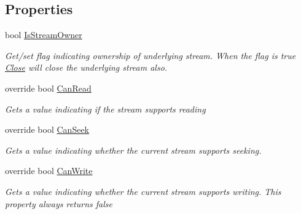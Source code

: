 \subsection*{Properties}
\begin{DoxyCompactItemize}
\item 
bool \hyperlink{class_i_c_sharp_code_1_1_sharp_zip_lib_1_1_b_zip2_1_1_b_zip2_input_stream_ac3a519335b1b9d046e6b7e124ff407f7}{Is\+Stream\+Owner}
\begin{DoxyCompactList}\small\item\em Get/set flag indicating ownership of underlying stream. When the flag is true \hyperlink{class_i_c_sharp_code_1_1_sharp_zip_lib_1_1_b_zip2_1_1_b_zip2_input_stream_a6f1fff887e482b4f72fac6295b456f02}{Close} will close the underlying stream also. \end{DoxyCompactList}\item 
override bool \hyperlink{class_i_c_sharp_code_1_1_sharp_zip_lib_1_1_b_zip2_1_1_b_zip2_input_stream_acfc22ee9e85e1bf158577d32001d070e}{Can\+Read}
\begin{DoxyCompactList}\small\item\em Gets a value indicating if the stream supports reading \end{DoxyCompactList}\item 
override bool \hyperlink{class_i_c_sharp_code_1_1_sharp_zip_lib_1_1_b_zip2_1_1_b_zip2_input_stream_aad8552765f8cdcf74b004799c7a2fe5d}{Can\+Seek}
\begin{DoxyCompactList}\small\item\em Gets a value indicating whether the current stream supports seeking. \end{DoxyCompactList}\item 
override bool \hyperlink{class_i_c_sharp_code_1_1_sharp_zip_lib_1_1_b_zip2_1_1_b_zip2_input_stream_af764ba8aa62f96ace82dac397a07ed12}{Can\+Write}
\begin{DoxyCompactList}\small\item\em Gets a value indicating whether the current stream supports writing. This property always returns false \end{DoxyCompactList}\item 

\end{DoxyCompactItemize}
